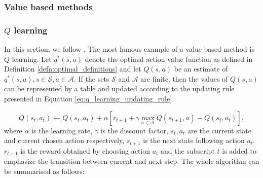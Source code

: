 \subsubsection{Value based methods}
\subsubsection{$Q$ learning}
In this section, we follow \cite[Section 6.5.]{sutton2018reinforcement}.
The most famous example of a value based method is $Q$ learning.
Let $q^*(s,a)$ denote the optimal action value function as defined in Definition \ref{defn:optimal_definitions} and let $Q(s,a)$ be an estimate of $q^*(s,a), s \in \mathcal{S}, a \in \mathcal{A}$. If the sets $\mathcal{S}$ and $\mathcal{A}$ are finite, then the values of $Q(s,a)$ can be represented by a table and updated according to the updating rule presented in Equation \ref{eq:q_learning_updating_rule}.

\begin{equation}
Q(s_t, a_t) \leftarrow Q(s_t, a_t) + \alpha \left[r_{t+1} + \gamma \underset{a \in \mathcal{A}}{\max}Q(s_{t+1}, a) - Q(s_t, a_t) \right],
\label{eq:q_learning_updating_rule}
\end{equation}
where $\alpha$ is the learning rate, $\gamma$ is the discount factor, $s_t, a_t$ are the current state and current chosen action respectively, $s_{t+1}$ is the next state following action $a_t$, $r_{t+1}$ is the reward obtained by choosing action $a_t$ and the subscript $t$ is added to emphasize the transition between current and next step.
The whole algorithm can be summarised as follows:

\renewcommand{\algorithmicrequire}{\textbf{Input:}}
\renewcommand{\algorithmicensure}{\textbf{Output:}}


